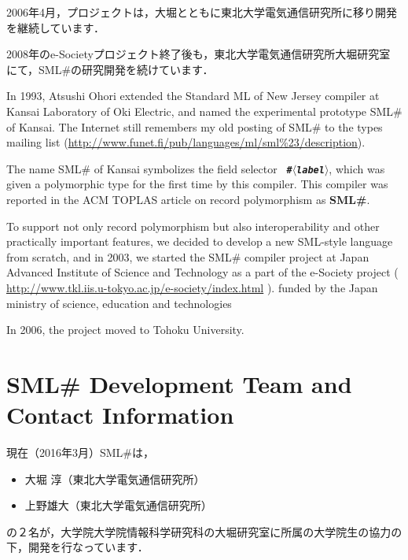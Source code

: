 \documentclass{jbook}
\newif\ifjp
\newcommand{\txt}[2]{#2}
\newcommand{\smlsharp}{SML\#}
\newcommand{\nonterm}[1]{\mbox{$\langle$}{\it #1}\mbox{$\rangle$}}
\begin{document}
2006年4月，プロジェクトは，大堀とともに東北大学電気通信研究所に移り開発
を継続しています．

2008年のe-Societyプロジェクト終了後も，東北大学電気通信研究所大堀研究室
にて，\smlsharp{}の研究開発を続けています．

\else%

	In 1993, Atsushi Ohori extended the Standard ML of New Jersey
compiler at Kansai Laboratory of Oki Electric, and named the
experimental prototype SML\# of Kansai.
	The Internet still remembers my old posting of \smlsharp{} to
the types mailing list 
(\url{http://www.funet.fi/pub/languages/ml/sml%23/description}).

	The name SML\# of Kansai symbolizes the field selector {\bf\tt
\#\nonterm{label}}, which was given a polymorphic type for the first
time by this compiler.
	This compiler was reported in the ACM TOPLAS article on record
polymorphism \cite{ohor95toplas} as {\bf \smlsharp{}}.

	To support not only record polymorphism but also
interoperability and other practically important features, we decided 
to develop a new SML-style language from scratch, and in 2003, we
started the \smlsharp{} compiler project at Japan Advanced Institute of 
Science and Technology as a part of the e-Society project 
(
\url{http://www.tkl.iis.u-tokyo.ac.jp/e-society/index.html}
).
funded by the Japan ministry of science, education and technologies

	In 2006, the project moved to Tohoku University.
\fi%

\section{
\txt{\smlsharp{}開発チームと連絡先情報}
{\smlsharp{} Development Team and Contact Information}
}
\label{sec:smlsharpTeam}

\ifjp%
	現在（2016年3月）\smlsharp{}は，
\begin{itemize}
\item 
大堀 淳（東北大学電気通信研究所）
\item 
上野雄大（東北大学電気通信研究所）
\end{itemize}
の２名が，大学院大学院情報科学研究科の大堀研究室に所属の大学院生の協力の
下，開発を行なっています．
\end{document}
